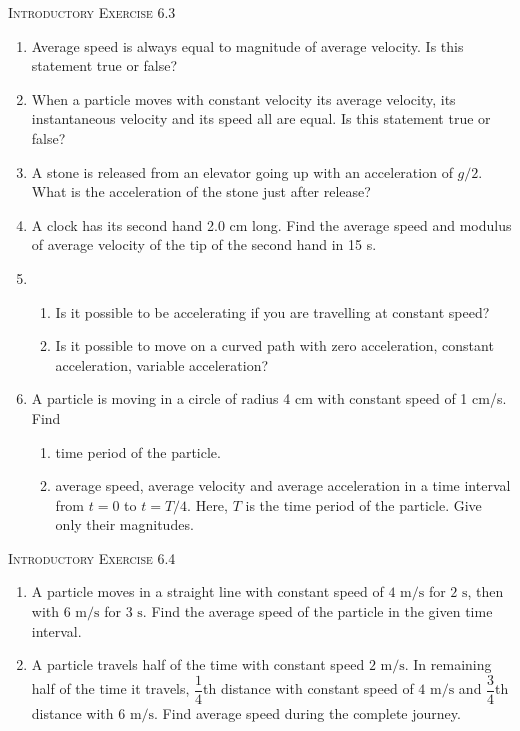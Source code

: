 \documentclass{article}
\renewcommand{\frac}[2]{\dfrac{#1}{#2}}
\begin{document}
\vspace*{10 mm}
\begin{center}
    \textsc{Introductory Exercise 6.3}
\end{center}
\begin{enumerate}
    \item Average speed is always equal to magnitude of average velocity. Is this statement true or false?
    \item When a particle moves with constant velocity its average velocity, its instantaneous velocity and its speed all are equal. Is this statement true or false?
    \item A stone is released from an elevator going up with an acceleration of \( g/2 \). What is the acceleration of the stone just after release?
    \item A clock has its second hand 2.0 cm long. Find the average speed and modulus of average velocity of the tip of the second hand in 15 s.
    \item 
    \begin{enumerate}
        \item Is it possible to be accelerating if you are travelling at constant speed?
        \item Is it possible to move on a curved path with zero acceleration, constant acceleration, variable acceleration?
    \end{enumerate}
    \item A particle is moving in a circle of radius 4 cm with constant speed of 1 cm/s. Find
    \begin{enumerate}
        \item time period of the particle.
        \item average speed, average velocity and average acceleration in a time interval from \( t = 0 \) to \( t = T/4 \). Here, \( T \) is the time period of the particle. Give only their magnitudes.
    \end{enumerate}
\end{enumerate}

\vspace*{10 mm}
\begin{center}
    \textsc{Introductory Exercise 6.4}
\end{center}
\begin{enumerate}
    \item A particle moves in a straight line with constant speed of \(4 \text{ m/s} \) for \(2 \text{ s}\), then with \(6 \text{ m/s}\) for \(3 \text{ s}\). Find the average speed of the particle in the given time interval.
    \item A particle travels half of the time with constant speed \(2 \text{ m/s}\). In remaining half of the time it travels, \(\frac{1}{4}\)th distance with constant speed of \(4 \text{ m/s}\) and \(\frac{3}{4}\)th distance with \(6 \text{ m/s}\). Find average speed during the complete journey.
\end{enumerate}
\end{document}
